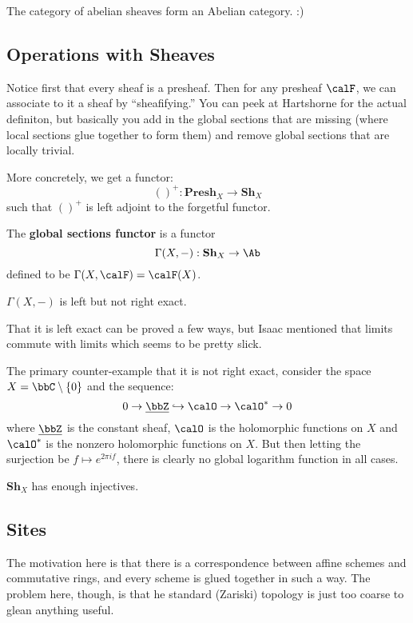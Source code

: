 \documentclass[12pt]{article}
\begin{document}
\begin{prop}
	The category of abelian sheaves form an Abelian category. :)
\end{prop}

\subsection{Operations with Sheaves}
Notice first that every sheaf is a presheaf. Then for any presheaf $\calF$, we can associate to it a sheaf 
by ``sheafifying.'' You can peek at Hartshorne for the actual definiton, but basically you add in the global sections that are missing (where local sections glue together to form them)
and remove global sections that are locally trivial.

More concretely, we get a functor:
\[()^+:\mathbf{Presh}_X\to\mathbf{Sh}_X\]
such that $()^+$ is left adjoint to the forgetful functor.

\begin{defn}
	The \textbf{global sections functor} is a functor 
	\[\Gamma(X,-):\mathbf{Sh}_X\to\Ab\]
	defined to be $\Gamma(X,\calF)=\calF(X)$.
\end{defn}
\begin{prop}
	$\Gamma(X,-)$ is left but not right exact.
\end{prop}
\begin{prf}
	That it is left exact can be proved a few ways, but Isaac mentioned that limits commute with limits which seems to be pretty slick.

	The primary counter-example that it is not right exact, consider the space $X=\bbC\setminus \{0\}$ and the sequence:
	\[0\to\underline\bbZ\hookrightarrow \calO\to \calO^\ast\to 0\]
	where $\underline\bbZ$ is the constant sheaf, $\calO$ is the holomorphic functions on $X$ and $\calO^\ast$ is the nonzero holomorphic functions on $X$. But then letting 
	the surjection be $f\mapsto e^{2\pi i f}$, there is clearly no global logarithm function in all cases. 
\end{prf}

\begin{thm}[Grothendieck `57]
	$\mathbf{Sh}_X$ has enough injectives.
\end{thm}

\subsection{Sites}
The motivation here is that there is a correspondence between affine schemes and commutative rings, and every scheme is glued together in such a way.
The problem here, though, is that he standard (Zariski) topology is just too coarse to glean anything useful.
\end{document}
